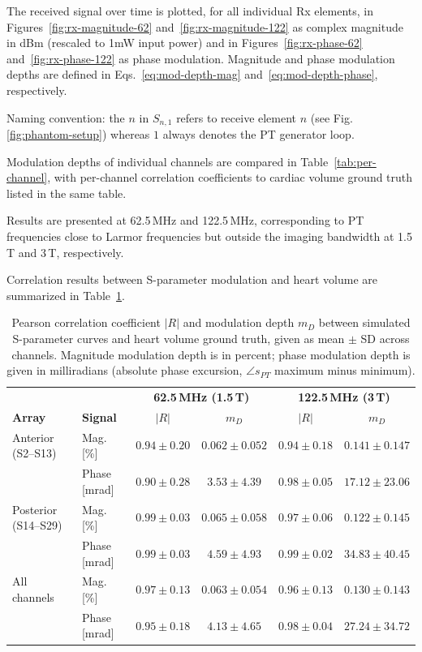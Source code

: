 \documentclass[
]{article}
\begin{document}
The received signal over time is plotted, for all individual Rx
elements, in Figures~\ref{fig:rx-magnitude-62} and~\ref{fig:rx-magnitude-122} as complex magnitude in dBm (rescaled to
1mW input power) and in Figures~\ref{fig:rx-phase-62} and~\ref{fig:rx-phase-122} as phase modulation. Magnitude and phase modulation depths are defined in Eqs.~\eqref{eq:mod-depth-mag} and~\eqref{eq:mod-depth-phase}, respectively.

Naming convention: the $n$ in $S_{n,1}$ refers to receive element $n$ (see Fig. \ref{fig:phantom-setup}) whereas $1$ always denotes the PT generator loop.

Modulation depths of individual channels are compared in
Table~\ref{tab:per-channel}, with per-channel correlation coefficients to cardiac volume ground truth listed in the same table.

Results are presented at 62.5\,MHz and 122.5\,MHz, corresponding to PT frequencies close to Larmor frequencies but outside the imaging bandwidth at 1.5\,T and 3\,T, respectively.

Correlation results between S-parameter modulation and heart volume are summarized in Table~\ref{tab:correlation}.

\begin{table}[ht]
\centering

\caption{Pearson correlation coefficient $|R|$ and modulation depth $m_D$ between simulated S-parameter curves and heart volume ground truth, given as mean $\pm$ SD across channels. Magnitude modulation depth is in percent; phase modulation depth is given in milliradians (absolute phase excursion, $\angle s_{PT}$ maximum minus minimum).}
\label{tab:correlation}
\begin{tabular}{ll|cc|cc}
\hline
 & & \multicolumn{2}{c|}{\textbf{62.5\,MHz (1.5\,T)}} & \multicolumn{2}{c}{\textbf{122.5\,MHz (3\,T)}} \\
\textbf{Array} & \textbf{Signal} & $|R|$ & $m_D$ & $|R|$ & $m_D$ \\
\hline
Anterior (S2--S13) & Mag. [\%] & $0.94 \pm 0.20$ & $0.062 \pm 0.052$ & $0.94 \pm 0.18$ & $0.141 \pm 0.147$ \\
                   & Phase [mrad] & $0.90 \pm 0.28$ & $3.53 \pm 4.39$ & $0.98 \pm 0.05$ & $17.12 \pm 23.06$ \\
Posterior (S14--S29) & Mag. [\%] & $0.99 \pm 0.03$ & $0.065 \pm 0.058$ & $0.97 \pm 0.06$ & $0.122 \pm 0.145$ \\
                     & Phase [mrad] & $0.99 \pm 0.03$ & $4.59 \pm 4.93$ & $0.99 \pm 0.02$ & $34.83 \pm 40.45$ \\
\hline
All channels & Mag. [\%] & $0.97 \pm 0.13$ & $0.063 \pm 0.054$ & $0.96 \pm 0.13$ & $0.130 \pm 0.143$ \\
             & Phase [mrad] & $0.95 \pm 0.18$ & $4.13 \pm 4.65$ & $0.98 \pm 0.04$ & $27.24 \pm 34.72$ \\
\hline
\end{tabular}

\end{table}
\end{document}
